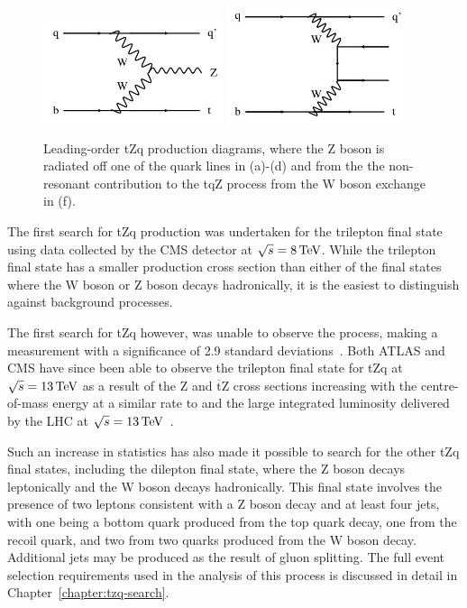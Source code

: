 \begin{figure}[htbp]
\includegraphics[width=0.47\textwidth]{figs/top-physics/tZq_feyn5.jpg}
\includegraphics[width=0.47\textwidth]{figs/top-physics/tZq_feyn6.jpg}
\caption{Leading-order tZq production diagrams, where the Z boson is radiated off one of the quark lines in (a)-(d) and from the the non-resonant contribution to the tqZ process from the W boson exchange in (f).}
\label{fig:feyn_tZq}
\end{figure}




The first search for tZq production was undertaken for the trilepton final state using data collected by the CMS detector at $\sqrt{s} = 8\,\text{Te\hspace{-.08em}V}$.
While the trilepton final state has a smaller production cross section than either of the final states where the W boson or Z boson decays hadronically, it is the easiest to distinguish against background processes.

The first search for tZq however, was unable to observe the process, making a measurement with a significance of 2.9 standard deviations~\cite{Sirunyan:2017kkr}.
Both ATLAS and CMS have since been able to observe the trilepton final state for tZq at $\sqrt{s} = 13\,\text{Te\hspace{-.08em}V}$ as a result of the Z and $\overline{\text{t}}$Z cross sections increasing with the centre-of-mass energy at a similar rate to \ttZ and the large integrated luminosity delivered by the LHC at $\sqrt{s} = 13\,\text{Te\hspace{-.08em}V}$~\cite{Aaboud:2017ylb,Sirunyan:2017nbr}.

Such an increase in statistics has also made it possible to search for the other tZq final states, including the dilepton final state, where the Z boson decays leptonically and the W boson decays hadronically.
This final state involves the presence of two leptons consistent with a Z boson decay and at least four jets, with one being a bottom quark produced from the top quark decay, one from the recoil quark, and two from two quarks produced from the W boson decay.
Additional jets may be produced as the result of gluon splitting.
The full event selection requirements used in the analysis of this process is discussed in detail in Chapter~\ref{chapter:tzq-search}.

